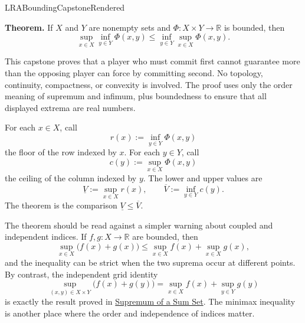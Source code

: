 \ifcsname LRABoundingCapstoneRendered\endcsname
\else
\expandafter\gdef\csname LRABoundingCapstoneRendered\endcsname{}

\label{prf:capstone-bounding}
\label{cap:bounding}

\begin{tcolorbox}[
  colback=gray!6,
  colframe=gray!40,
  arc=2pt,
  left=8pt, right=8pt, top=6pt, bottom=6pt,
  title={\small\textbf{Capstone Theorem: The Minimax Inequality}},
  fonttitle=\small\bfseries
]
\textbf{Theorem.}
If \(X\) and \(Y\) are nonempty sets and
\(\Phi:X\times Y\to\mathbb{R}\) is bounded, then
\[
  \sup_{x \in X}\inf_{y \in Y}\Phi(x,y)
  \le
  \inf_{y \in Y}\sup_{x \in X}\Phi(x,y).
\]
\end{tcolorbox}

\begin{remark*}[Interpretation]
This capstone proves that a player who must commit first cannot guarantee
more than the opposing player can force by committing second. No topology,
continuity, compactness, or convexity is involved. The proof uses only the
order meaning of supremum and infimum, plus boundedness to ensure that all
displayed extrema are real numbers.
\end{remark*}

\begin{remark*}[Interpretation]
For each \(x\in X\), call
\[
  r(x):=\inf_{y\in Y}\Phi(x,y)
\]
the floor of the row indexed by \(x\). For each \(y\in Y\), call
\[
  c(y):=\sup_{x\in X}\Phi(x,y)
\]
the ceiling of the column indexed by \(y\). The lower and upper values are
\[
  \underline V:=\sup_{x\in X}r(x),
  \qquad
  \overline V:=\inf_{y\in Y}c(y).
\]
The theorem is the comparison \(\underline V\le\overline V\).
\end{remark*}

\begin{remark*}[Orientation]
The theorem should be read against a simpler warning about coupled and
independent indices. If \(f,g:X\to\mathbb{R}\) are bounded, then
\[
  \sup_{x\in X}\bigl(f(x)+g(x)\bigr)
  \le
  \sup_{x\in X} f(x)+\sup_{x\in X} g(x),
\]
and the inequality can be strict when the two suprema occur at different
points. By contrast, the independent grid identity
\[
  \sup_{(x,y)\in X\times Y}\bigl(f(x)+g(y)\bigr)
  =
  \sup_{x\in X} f(x)+\sup_{y\in Y} g(y)
\]
is exactly the result proved in
\hyperref[thm:supremum-sum-set]{Supremum of a Sum Set}. The minimax
inequality is another place where the order and independence of indices
matter.
\end{remark*}

